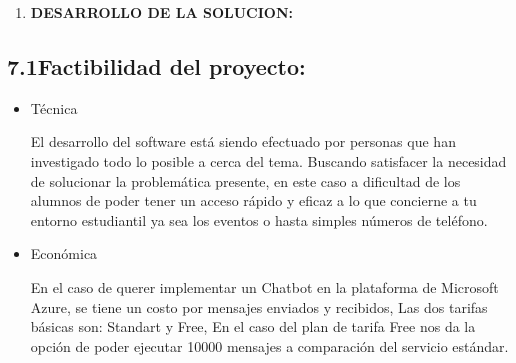 \documentclass[12pt]{report}
\begin{document}
\vspace{\baselineskip}\setlength{\parskip}{0.0pt}
\begin{enumerate}
	\item \textbf{DESARROLLO DE LA SOLUCION:}\par


\end{enumerate}\subsection*{7.1\hspace*{10pt}Factibilidad del proyecto:}
\begin{itemize}
	\item {\fontsize{10pt}{12.0pt}\selectfont Técnica\par}\par

{\fontsize{10pt}{12.0pt}\selectfont El desarrollo del software está siendo efectuado por personas que han investigado todo lo posible a cerca del tema. Buscando satisfacer la necesidad de solucionar la problemática presente, en este caso a dificultad de los alumnos de poder tener un acceso rápido y eficaz a lo que concierne a tu entorno estudiantil ya sea los eventos o hasta simples números de teléfono.\par}\par


\vspace{\baselineskip}
	\item {\fontsize{10pt}{12.0pt}\selectfont Económica\par}\par

{\fontsize{10pt}{12.0pt}\selectfont En el caso de querer implementar un Chatbot en la plataforma de Microsoft Azure, se tiene un costo por mensajes enviados y recibidos, Las dos tarifas básicas son: Standart y Free, En el caso del plan de tarifa Free nos da la opción de poder ejecutar 10000 mensajes a comparación del servicio estándar.\par}\par





\end{itemize}
\end{document}
